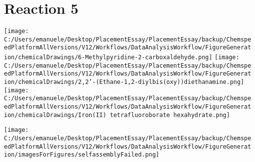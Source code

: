 \documentclass{article}%
\begin{document}
\section*{Reaction 5}%
%
\begin{scheme}[H]%
\begin{minipage}{0.5\textwidth}%
\texttt{[image: C:/Users/emanuele/Desktop/PlacementEssay/PlacementEssay/backup/ChemspeedPlatformAllVersions/V12/Workflows/DataAnalysisWorkflow/FigureGeneration/chemicalDrawings/6-Methylpyridine-2-carboxaldehyde.png]}%
\texttt{[image: C:/Users/emanuele/Desktop/PlacementEssay/PlacementEssay/backup/ChemspeedPlatformAllVersions/V12/Workflows/DataAnalysisWorkflow/FigureGeneration/chemicalDrawings/2,2'-(Ethane-1,2-diylbis(oxy))diethanamine.png]}%
\texttt{[image: C:/Users/emanuele/Desktop/PlacementEssay/PlacementEssay/backup/ChemspeedPlatformAllVersions/V12/Workflows/DataAnalysisWorkflow/FigureGeneration/chemicalDrawings/Iron(II) tetrafluoroborate hexahydrate.png]}%
\end{minipage}%
\begin{minipage}{0.5\textwidth}%
\begin{center}%
\texttt{[image: C:/Users/emanuele/Desktop/PlacementEssay/PlacementEssay/backup/ChemspeedPlatformAllVersions/V12/Workflows/DataAnalysisWorkflow/FigureGeneration/imagesForFigures/selfassemblyFailed.png]}%
\end{center}%
\end{minipage}%
\caption{Self-assembly of components 8, 19, with Iron(II) in a 3.0:1.5:1.0 molar ratio in CH$_3$CN at 60\textdegree C for 40h. These are the reagents (starting materials) for reaction 5.}%
\end{scheme}%
\end{document}
